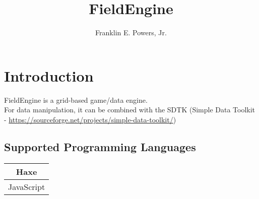 \documentclass[11pt]{article}
\title{FieldEngine}
\author{Franklin E. Powers, Jr.}
\begin{document}
\maketitle

\section{Introduction}
FieldEngine is a grid-based game/data engine. \\

For data manipulation, it can be combined with the SDTK (Simple Data Toolkit - \href{https://sourceforge.net/projects/simple-data-toolkit/}{https://sourceforge.net/projects/simple-data-toolkit/}) \\

\subsection{Supported Programming Languages}
\begin{center}
\begin{tabular}{ | c | }
\hline
Haxe \\
\hline
JavaScript \\
\hline
\end{tabular}
\end{center}
\end{document}
